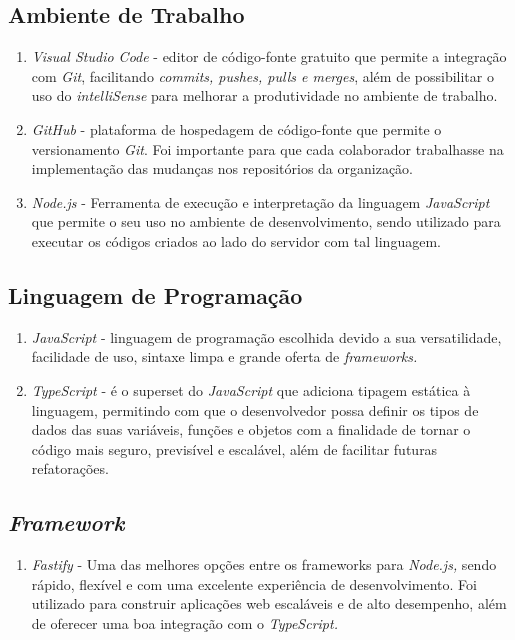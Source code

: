 \subsection{Ambiente de Trabalho}

\begin{enumerate}
	\item\textit{Visual Studio Code} - editor de código-fonte gratuito que permite a integração com \textit{Git}, facilitando \textit{commits, pushes, pulls e merges}, além de possibilitar o uso do \textit{intelliSense} para melhorar a produtividade no ambiente de trabalho.
	
	\item \textit{GitHub} -  plataforma de hospedagem de código-fonte que permite o versionamento \textit{Git}. Foi importante para que cada colaborador trabalhasse na implementação das mudanças nos repositórios da organização.
	
	\item \textit{Node.js} -  Ferramenta de execução e interpretação da linguagem \textit{JavaScript} que permite o seu uso no ambiente de desenvolvimento, sendo utilizado para executar os códigos criados ao lado do servidor com tal linguagem. 
\end{enumerate}


\subsection{Linguagem de Programação}

\begin{enumerate}
	\item \textit{JavaScript} -   linguagem de programação escolhida devido a sua  versatilidade, facilidade de uso, sintaxe limpa e grande oferta de \textit{frameworks.}
	\item \textit{TypeScript} - é o superset do \textit{JavaScript} que adiciona tipagem estática à linguagem,  permitindo com que o desenvolvedor possa definir os tipos de dados das suas variáveis, funções e objetos com a finalidade de tornar o código mais seguro, previsível e escalável, além de facilitar futuras refatorações.

\end{enumerate}

\subsection{\textit{Framework}}

\begin{enumerate}
	\item\textit{Fastify} - Uma das melhores opções entre os frameworks para \textit{Node.js,} sendo rápido, flexível e com uma excelente experiência de desenvolvimento. Foi utilizado para construir aplicações web escaláveis e de alto desempenho, além de oferecer uma boa integração com o \textit{TypeScript.} 
\end{enumerate}

